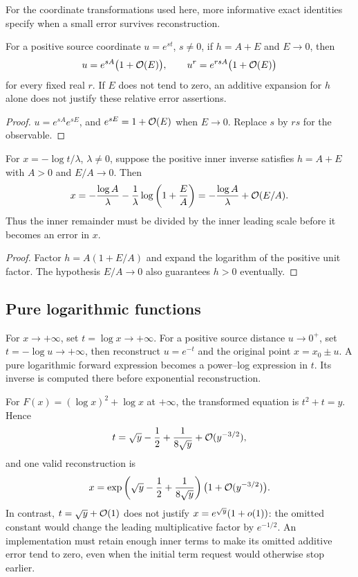 For the coordinate transformations used here, more informative exact identities specify when a small error survives reconstruction.

\begin{corollary}
\label{cor:exponential-reconstruction}
For a positive source coordinate $u=e^{s t}$, $s\ne0$, if $h=A+E$ and $E\to0$, then
\begin{equation}
 u=e^{sA}\bigl(1+\mathcal O(E)\bigr),\qquad
 u^r=e^{rsA}\bigl(1+\mathcal O(E)\bigr)
 \label{eq:exponential-reconstruction}
\end{equation}
for every fixed real $r$. If $E$ does not tend to zero, an additive expansion for $h$ alone does not justify these relative error assertions.
\end{corollary}
\begin{proof}
$u=e^{sA}e^{sE}$, and $e^{sE}=1+\mathcal O(E)$ when $E\to0$. Replace $s$ by $rs$ for the observable.
\end{proof}

\begin{corollary}
\label{cor:logarithmic-reconstruction}
For $x=-\log t/\lambda$, $\lambda\ne0$, suppose the positive inner inverse satisfies $h=A+E$ with $A>0$ and $E/A\to0$. Then
\begin{equation}
 x=-\frac{\log A}{\lambda}
 -\frac1\lambda\log\left(1+\frac EA\right)
 =-\frac{\log A}{\lambda}+\mathcal O(E/A).
 \label{eq:logarithmic-reconstruction}
\end{equation}
Thus the inner remainder must be divided by the inner leading scale before it becomes an error in $x$.
\end{corollary}
\begin{proof}
Factor $h=A(1+E/A)$ and expand the logarithm of the positive unit factor. The hypothesis $E/A\to0$ also guarantees $h>0$ eventually.
\end{proof}

\subsection{Pure logarithmic functions}

For $x\to+\infty$, set $t=\log x\to+\infty$. For a positive source distance $u\to0^+$, set $t=-\log u\to+\infty$, then reconstruct $u=e^{-t}$ and the original point $x=x_0\pm u$. A pure logarithmic forward expression becomes a power--log expression in $t$. Its inverse is computed there before exponential reconstruction.

\begin{example}
For $F(x)=(\log x)^2+\log x$ at $+\infty$, the transformed equation is $t^2+t=y$. Hence
\[
 t=\sqrt y-\frac12+\frac1{8\sqrt y}+\mathcal O(y^{-3/2}),
\]
and one valid reconstruction is
\[
 x=\exp\left(\sqrt y-\frac12+\frac1{8\sqrt y}\right)
 \bigl(1+\mathcal O(y^{-3/2})\bigr).
\]
In contrast, $t=\sqrt y+\mathcal O(1)$ does not justify $x=e^{\sqrt y}(1+o(1))$: the omitted constant would change the leading multiplicative factor by $e^{-1/2}$. An implementation must retain enough inner terms to make its omitted additive error tend to zero, even when the initial term request would otherwise stop earlier.
\end{example}

